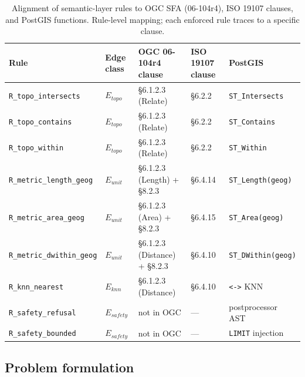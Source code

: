 \documentclass[11pt]{article}
\begin{document}
\begin{table}[t]
\centering\footnotesize
\caption{Alignment of semantic-layer rules to OGC SFA (06-104r4), ISO 19107 clauses, and PostGIS functions. Rule-level mapping; each enforced rule traces to a specific clause.}
\label{tab:alignment}
{\setlength{\tabcolsep}{4pt}
\begin{tabular}{@{}lllll@{}}
\toprule
Rule & Edge class & OGC 06-104r4 clause & ISO 19107 clause & PostGIS \\
\midrule
\texttt{R\_topo\_intersects} & $E_{topo}$ & \S 6.1.2.3 (Relate)   & \S 6.2.2 & \texttt{ST\_Intersects} \\
\texttt{R\_topo\_contains}   & $E_{topo}$ & \S 6.1.2.3 (Relate)   & \S 6.2.2 & \texttt{ST\_Contains} \\
\texttt{R\_topo\_within}     & $E_{topo}$ & \S 6.1.2.3 (Relate)   & \S 6.2.2 & \texttt{ST\_Within} \\
\texttt{R\_metric\_length\_geog}   & $E_{unit}$ & \S 6.1.2.3 (Length) + \S 8.2.3 & \S 6.4.14 & \texttt{ST\_Length(geog)} \\
\texttt{R\_metric\_area\_geog}     & $E_{unit}$ & \S 6.1.2.3 (Area) + \S 8.2.3   & \S 6.4.15 & \texttt{ST\_Area(geog)} \\
\texttt{R\_metric\_dwithin\_geog}  & $E_{unit}$ & \S 6.1.2.3 (Distance) + \S 8.2.3 & \S 6.4.10 & \texttt{ST\_DWithin(geog)} \\
\texttt{R\_knn\_nearest}     & $E_{knn}$  & \S 6.1.2.3 (Distance) & \S 6.4.10 & \texttt{<->} KNN \\
\texttt{R\_safety\_refusal}  & $E_{safety}$ & not in OGC & --- & postprocessor AST \\
\texttt{R\_safety\_bounded}  & $E_{safety}$ & not in OGC & --- & \texttt{LIMIT} injection \\
\bottomrule
\end{tabular}
}
\end{table}

\subsection{Problem formulation}
\end{document}
